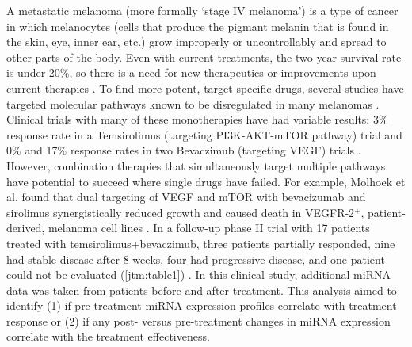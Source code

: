 A metastatic melanoma (more formally `stage IV melanoma') is a type of cancer
in which melanocytes (cells that produce the pigmant melanin that is found in
the skin, eye, inner ear, etc.) grow improperly or uncontrollably 
and spread to other parts of the
body. Even with current treatments, the two-year survival rate is 
under 20\%, so there is a need for new therapeutics
or improvements upon current therapies \cite{Robert:2011vp}\cite{Hodi:2010wt}.
To find more potent, target-specific drugs, several studies have targeted
molecular pathways known to be disregulated in many melanomas \cite{Ko:2011dk}.
Clinical trials with many of these monotherapies have had variable results:
3\% response rate in a Temsirolimus (targeting PI3K-AKT-mTOR pathway) 
trial and 0\% and 17\% response rates in two Bevaczimub (targeting VEGF)
trials \cite{Margolin:2004vl,Varker:2007dj,Schuster:2012fo}.
However, combination therapies that simultaneously target multiple
pathways have potential to succeed where single drugs have failed.
For example, Molhoek et al. found that dual targeting of VEGF and mTOR
with bevacizumab and sirolimus synergistically reduced growth
and caused death in VEGFR-2$^{+}$, patient-derived, melanoma cell lines \cite{Molhoek:2008jx}.
In a follow-up phase II trial with 17 patients treated with temsirolimus+bevaczimub,
three patients partially responded, nine had stable disease after 8 weeks,
four had progressive disease, and one patient could not be 
evaluated (\autoref{jtm:table1}) \cite{Slingluff:2013ej}. In this clinical study, additional miRNA data
was taken from patients before and after treatment. This analysis aimed to 
identify (1) if pre-treatment miRNA expression profiles 
correlate with treatment response or (2) if any post- versus pre-treatment
changes in miRNA expression correlate with the treatment effectiveness.

